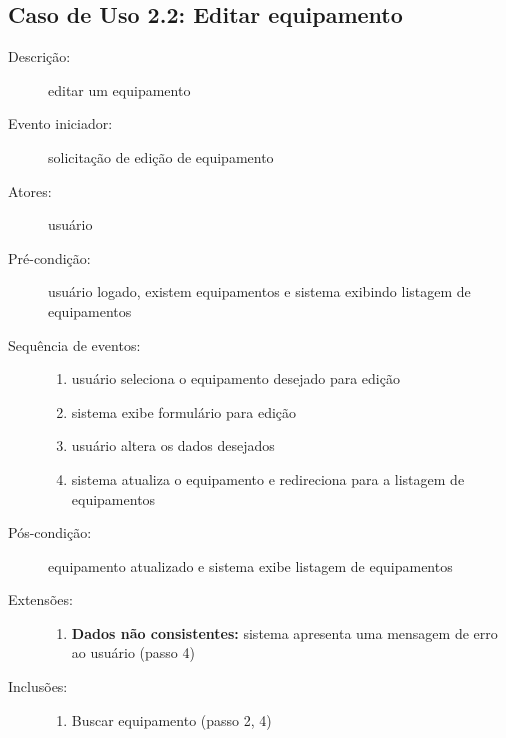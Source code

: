 \subsection{Caso de Uso 2.2: Editar equipamento}
\begin{description}
	\item[Descrição:] editar um equipamento
	\item[Evento iniciador:] solicitação de edição de equipamento
	\item[Atores:] usuário
	\item[Pré-condição:] usuário logado, existem equipamentos e sistema exibindo listagem de equipamentos
	\item[Sequência de eventos:] \hfill
		\begin{enumerate}
			\item{usuário seleciona o equipamento desejado para edição}
			\item{sistema exibe formulário para edição}
			\item{usuário altera os dados desejados}
			\item{sistema atualiza o equipamento e redireciona para a listagem de equipamentos}
		\end{enumerate}
	\item[Pós-condição:] equipamento atualizado e sistema exibe listagem de equipamentos
	\item[Extensões:] \hfill
		\begin{enumerate}
			\item{\textbf{Dados não consistentes:} sistema apresenta uma mensagem de erro ao usuário (passo 4)}
		\end{enumerate}
	\item[Inclusões:] \hfill
		\begin{enumerate}
			\item{Buscar equipamento (passo 2, 4)}
		\end{enumerate}
\end{description}
%
